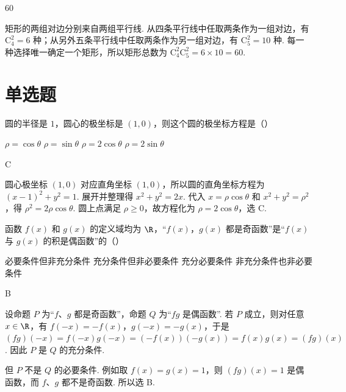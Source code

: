 \documentclass[UTF8,a4paper,oneside,11pt]{ctexbook}
\begin{document}
\begin{answer}
\(60\)
\end{answer}

\begin{solution}
矩形的两组对边分别来自两组平行线. 从四条平行线中任取两条作为一组对边，有 \(\mathrm C_4^2=6\) 种；从另外五条平行线中任取两条作为另一组对边，有 \(\mathrm C_5^2=10\) 种. 每一种选择唯一确定一个矩形，所以矩形总数为 \(\mathrm C_4^2\mathrm C_5^2=6\times10=60\).
\end{solution}

\section{单选题}

\begin{problem}
圆的半径是 \(1\)，圆心的极坐标是 \((1,0)\)，则这个圆的极坐标方程是（\quad）

\choices
    {\(\rho=\cos\theta\)}
    {\(\rho=\sin\theta\)}
    {\(\rho=2\cos\theta\)}
    {\(\rho=2\sin\theta\)}
\end{problem}

\begin{answer}
C
\end{answer}

\begin{solution}
圆心极坐标 \((1,0)\) 对应直角坐标 \((1,0)\)，所以圆的直角坐标方程为 \(\left(x-1\right)^2+y^2=1\). 展开并整理得 \(x^2+y^2=2x\). 代入 \(x=\rho\cos\theta\) 和 \(x^2+y^2=\rho^2\)，得 \(\rho^2=2\rho\cos\theta\). 圆上点满足 \(\rho\geq0\)，故方程化为 \(\rho=2\cos\theta\)，选 C.
\end{solution}

\begin{problem}
函数 \(f(x)\) 和 \(g(x)\) 的定义域均为 \(\R\)，“\(f(x)\)，\(g(x)\) 都是奇函数”是“\(f(x)\) 与 \(g(x)\) 的积是偶函数”的（\quad）

\choices
    {必要条件但非充分条件}
    {充分条件但非必要条件}
    {充分必要条件}
    {非充分条件也非必要条件}
\end{problem}

\begin{answer}
B
\end{answer}

\begin{solution}
设命题 \(P\) 为“\(f\)、\(g\) 都是奇函数”，命题 \(Q\) 为“\(fg\) 是偶函数”. 若 \(P\) 成立，则对任意 \(x\in\R\)，有 \(f(-x)=-f(x)\)，\(g(-x)=-g(x)\)，于是
\((fg)(-x)=f(-x)g(-x)=\left(-f(x)\right)\left(-g(x)\right)=f(x)g(x)=(fg)(x)\). 因此 \(P\) 是 \(Q\) 的充分条件.

但 \(P\) 不是 \(Q\) 的必要条件. 例如取 \(f(x)=g(x)=1\)，则 \((fg)(x)=1\) 是偶函数，而 \(f\)、\(g\) 都不是奇函数. 所以选 B.
\end{solution}
\end{document}
